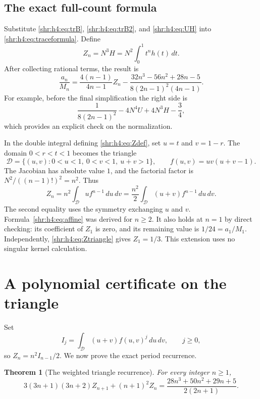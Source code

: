 \documentclass[11pt,letterpaper]{article}
\numberwithin{equation}{section}
\newtheorem{theorem}{Theorem}[section]
\theoremstyle{definition}
\newcommand{\1}{\mathbf 1}
\newcommand{\dd}{\,d}
\begin{document}
\subsection{The exact full-count formula}
Substitute \eqref{shr:h4:eq:trB}, \eqref{shr:h4:eq:trB2}, and \eqref{shr:h4:eq:UH} into
\eqref{shr:h4:eq:traceformula}. Define
\begin{equation}
 Z_n=N^3H=N^2\int_0^1t^nh(t)\dd t.
 \label{shr:h4:eq:Zdef}
\end{equation}
After collecting rational terms, the result is
\begin{equation}
 \frac{a_n}{M_n}
 =\frac{4(n-1)}{4n-1}Z_n
 -\frac{32n^3-56n^2+28n-5}{8(2n-1)^2(4n-1)}.
 \label{shr:h4:eq:affine}
\end{equation}
For example, before the final simplification the right side is
\[
 \frac1{8(2n-1)^2}-4N^4U+4N^3H-\frac34,
\]
which provides an explicit check on the normalization.

In the double integral defining \eqref{shr:h4:eq:Zdef}, set $u=t$ and $v=1-r$.
The domain $0<r<t<1$ becomes the triangle
\begin{equation}
 \mathcal D=\{(u,v):0<u<1,\ 0<v<1,\ u+v>1\},
 \qquad f(u,v)=uv(u+v-1).
 \label{shr:h4:eq:triangle}
\end{equation}
The Jacobian has absolute value $1$, and the factorial factor is
$N^2/((n-1)!)^2=n^2$. Thus
\begin{equation}
 Z_n=n^2\int_{\mathcal D}u f^{n-1}\dd u\dd v
     =\frac{n^2}2\int_{\mathcal D}(u+v)f^{n-1}\dd u\dd v.
 \label{shr:h4:eq:Ztriangle}
\end{equation}
The second equality uses the symmetry exchanging $u$ and $v$.
Formula~\eqref{shr:h4:eq:affine} was derived for $n\ge2$. It also holds at $n=1$
by direct checking: its coefficient of $Z_1$ is zero, and its remaining
value is $1/24=a_1/M_1$. Independently,
\eqref{shr:h4:eq:Ztriangle} gives $Z_1=1/3$. This extension uses no singular
kernel calculation.

\section{A polynomial certificate on the triangle}
\label{shr:h4:sec:certificate}
Set
\[
 I_j=\int_{\mathcal D}(u+v)f(u,v)^j\dd u\dd v,\qquad j\ge0,
\]
so $Z_n=n^2I_{n-1}/2$. We now prove the exact period recurrence.

\begin{theorem}[The weighted triangle recurrence]
\label{shr:h4:thm:Z}
For every integer $n\ge1$,
\begin{equation}
 3(3n+1)(3n+2)Z_{n+1}+(n+1)^2Z_n
 =\frac{28n^3+50n^2+29n+5}{2(2n+1)}.
 \label{shr:h4:eq:Zrec}
\end{equation}
\end{theorem}
\end{document}
